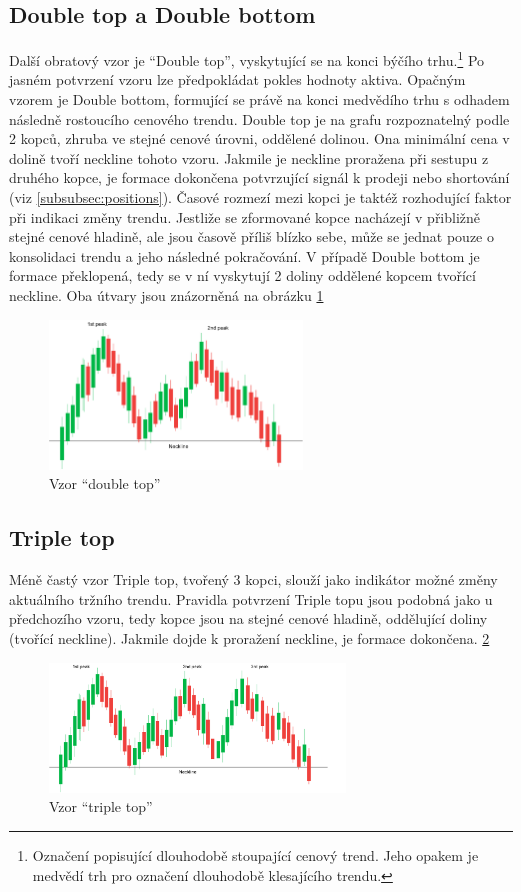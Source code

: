 \subsection{Double top a Double bottom}
Další obratový vzor je \enquote{Double top}, vyskytující se na konci býčího trhu.\footnote{Označení popisující dlouhodobě stoupající cenový trend. Jeho opakem je medvědí trh pro označení
    dlouhodobě klesajícího trendu.} Po jasném potvrzení vzoru lze předpokládat pokles hodnoty aktiva. Opačným vzorem je Double bottom, formující se právě na konci medvědího trhu
s odhadem následně rostoucího cenového trendu. Double top je na grafu rozpoznatelný podle 2 kopců, zhruba ve stejné cenové úrovni, oddělené dolinou. Ona minimální cena v dolině
tvoří neckline tohoto vzoru. Jakmile je neckline proražena při sestupu z druhého kopce, je formace dokončena potvrzující signál k prodeji nebo shortování (viz \ref{subsubsec:positions}). Časové rozmezí mezi
kopci je taktéž rozhodující faktor při indikaci změny trendu. Jestliže se zformované kopce nacházejí v přibližně stejné cenové hladině, ale jsou časově příliš blízko sebe, může se jednat
pouze o konsolidaci trendu a jeho následné pokračování.
V případě Double bottom je formace překlopená, tedy se v ní vyskytují 2 doliny oddělené kopcem tvořící neckline. Oba útvary jsou znázorněná na obrázku \ref{fig:double-top}
\begin{figure}[htb]
    \centering
    \includegraphics[width=0.6\textwidth]{Figures/double-top.pdf}
    \caption{Vzor \enquote{double top}}
    \label{fig:double-top}
\end{figure}

\subsection{Triple top}
Méně častý vzor Triple top, tvořený 3 kopci, slouží jako indikátor možné změny aktuálního tržního trendu. Pravidla potvrzení Triple topu jsou podobná jako u předchozího vzoru, tedy
kopce jsou na stejné cenové hladině, oddělující doliny (tvořící neckline). Jakmile dojde k proražení neckline, je formace dokončena. \ref{fig:triple-top}
\begin{figure}[htb]
    \centering
    \includegraphics[width=0.7\textwidth]{Figures/triple-top.pdf}
    \caption{Vzor \enquote{triple top}}
    \label{fig:triple-top}
\end{figure}

